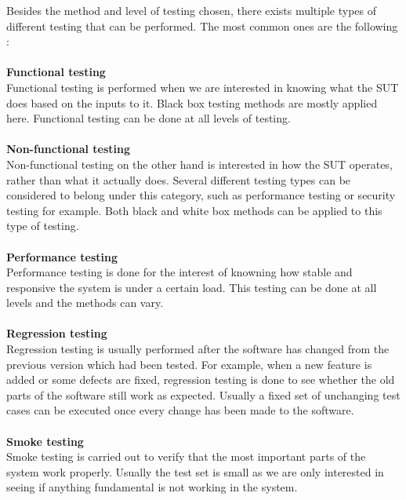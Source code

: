 \documentclass[english,12pt,a4paper,pdftex,elec,utf8]{aaltothesis}
\begin{document}
Besides the method and level of testing chosen, there exists multiple types of different testing that can be performed.  
The most common ones are the following \cite{sularikurssi, embeddedsofteng, testingcomplex}:\\
\\
\textbf{Functional testing}\\
Functional testing is performed when we are interested in knowing what the SUT does based on the inputs to it. Black box testing methods are mostly applied here. Functional testing can be done at all levels of testing.
\\
\\ 
\textbf{Non-functional testing}\\
Non-functional testing on the other hand is interested in how the SUT operates, rather than what it actually does. Several different testing types can be considered to belong under this category, such as performance testing or security testing for example. Both black and white box methods can be applied to this type of testing.
\\
\\ 
\textbf{Performance testing}\\
Performance testing is done for the interest of knowning how stable and responsive the system is under a certain load. This testing can be done at all levels and the methods can vary.
\\
\\ 
\textbf{Regression testing}\\
Regression testing is usually performed after the software has changed from the previous version which had been tested. For example, when a new feature is added or some defects are fixed, regression testing is done to see whether the old parts of the software still work as expected. Usually a fixed set of unchanging test cases can be executed once every change has been made to the software.
\\
\\ 
\textbf{Smoke testing}\\
Smoke testing is carried out to verify that the most important parts of the system work properly. Usually the test set is small as we are only interested in seeing if anything fundamental is not working in the system.
\end{document}
